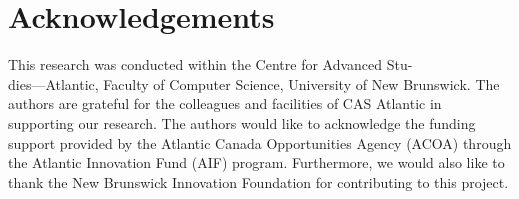 \documentclass[sigconf]{acmart}
\begin{document}









\maketitle















\section{Acknowledgements}

This research was conducted within the Centre for Advanced Stu-\\dies---Atlantic, Faculty of Computer Science, University of New Brunswick. The authors are grateful for the colleagues and facilities of CAS Atlantic in supporting our research. The authors would like to acknowledge the funding support provided by the Atlantic Canada Opportunities Agency (ACOA) through the Atlantic Innovation Fund (AIF) program. Furthermore, we would also like to thank the New Brunswick Innovation Foundation for contributing to this project.


{}
\end{document}
